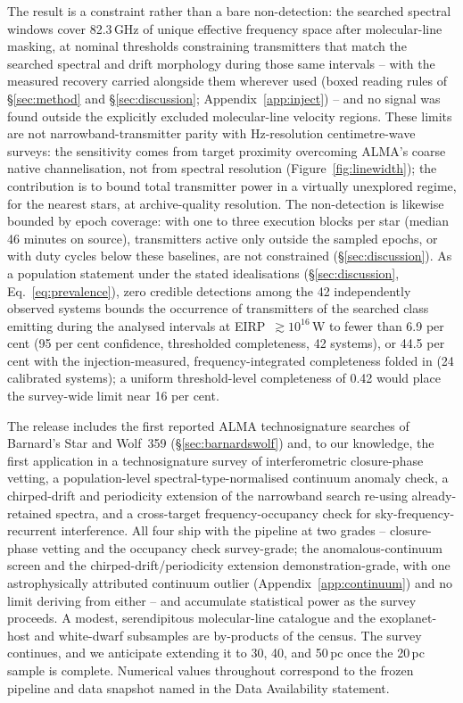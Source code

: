 \documentclass{openjournal}
\begin{document}
The result is a constraint rather than a bare non-detection: the
searched spectral windows cover 82.3\,GHz of unique effective
frequency space after molecular-line masking, at nominal thresholds
constraining transmitters that match the searched spectral and drift
morphology during those same intervals -- with the measured recovery
carried alongside them wherever used (boxed reading rules of
\S\ref{sec:method} and \S\ref{sec:discussion};
Appendix~\ref{app:inject}) -- and no signal was found outside the
explicitly excluded molecular-line velocity regions. These limits are
not narrowband-transmitter parity with Hz-resolution centimetre-wave
surveys: the sensitivity comes from target proximity overcoming
ALMA's coarse native channelisation, not from spectral resolution
(Figure~\ref{fig:linewidth}); the contribution is to bound total
transmitter power in a virtually unexplored regime, for the nearest
stars, at archive-quality resolution. The non-detection is likewise
bounded by epoch coverage: with one to three execution blocks per
star (median 46 minutes on source), transmitters active only outside
the sampled epochs, or with duty cycles below these baselines, are
not constrained (\S\ref{sec:discussion}). As a population statement
under the stated idealisations (\S\ref{sec:discussion},
Eq.~\ref{eq:prevalence}), zero credible detections among the 42
independently observed systems bounds the occurrence of transmitters
of the searched class emitting during the analysed intervals at
EIRP~$\gtrsim10^{16}$\,W to fewer than 6.9 per cent (95 per cent
confidence, thresholded completeness, 42 systems), or 44.5 per cent
with the injection-measured, frequency-integrated completeness folded
in (24 calibrated systems); a uniform threshold-level completeness of
0.42 would place the survey-wide limit near 16 per cent.

The release includes the first reported ALMA technosignature searches
of Barnard's Star and Wolf~359 (\S\ref{sec:barnardswolf}) and, to our
knowledge, the first application in a technosignature survey of
interferometric closure-phase vetting, a population-level
spectral-type-normalised continuum anomaly check, a chirped-drift and
periodicity extension of the narrowband search re-using
already-retained spectra, and a
cross-target frequency-occupancy check for sky-frequency-recurrent
interference. All four ship with the pipeline at two grades --
closure-phase vetting and the occupancy check survey-grade; the
anomalous-continuum screen and the chirped-drift/periodicity
extension demonstration-grade, with one astrophysically attributed
continuum outlier (Appendix~\ref{app:continuum}) and no limit deriving from
either -- and accumulate statistical power as the survey proceeds. A
modest, serendipitous molecular-line catalogue and the exoplanet-host
and white-dwarf subsamples are by-products of the census. The survey
continues, and we anticipate extending it to 30, 40, and 50\,pc once
the 20\,pc sample is complete. Numerical values throughout correspond
to the frozen pipeline and data snapshot named in the Data
Availability statement.
\end{document}
